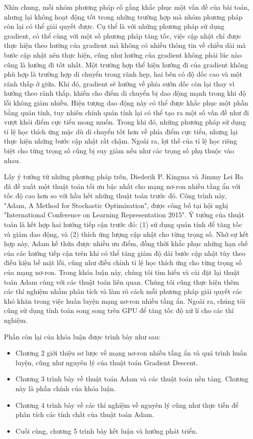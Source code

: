 Nhìn chung, mỗi nhóm phương pháp cố gắng khắc phục một vấn đề của bài toán, nhưng lại không hoạt động tốt trong những trường hợp mà nhóm phương pháp còn lại có thể giải quyết được. Cụ thể là với những phương pháp sử dụng gradient, có thể cùng với một số phương pháp tăng tốc, việc cập nhật chỉ được thực hiện theo hướng của gradient mà không có nhiều thông tin về chiều dài mà bước cập nhật nên thực hiện, cũng như hướng của gradient không phải lúc nào cũng là hướng đi tốt nhất. Một trường hợp thể hiện hướng đi của gradient không phù hợp là trường hợp di chuyển trong rãnh hẹp, hai bên có độ dốc cao và một rãnh thấp ở giữa. Khi đó, gradient sẽ hướng về phía sườn dốc còn lại thay vì hướng theo rãnh thấp, khiến cho điểm di chuyển bị dao động mạnh trong khi độ lỗi không giảm nhiều. Hiện tượng dao động này có thể được khắc phục một phần bằng quán tính, tuy nhiên chính quán tính lại có thể tạo ra một số vấn đề như đi vượt khỏi điểm cực tiểu mong muốn. Trong khi đó, những phương pháp sử dụng tỉ lệ học thích ứng mặc dù di chuyển tốt hơn về phía điểm cực tiểu, nhưng lại thực hiện những bước cập nhật rất chậm. Ngoài ra, lợi thế của tỉ lệ học riêng biệt cho từng trọng số cũng bị suy giảm nếu như các trọng số phụ thuộc vào nhau.

Lấy ý tưởng từ những phương pháp trên, Diederik P. Kingma và Jimmy Lei Ba đã đề xuất một thuật toán tối ưu bậc nhất cho mạng nơ-ron nhiều tầng ẩn với tốc độ cao hơn so với hầu hết những thuật toán trước đó. Công trình này, "Adam, A Method for Stochastic Optimization", được công bố tại hội nghị "International Conference on Learning Representation 2015". Ý tưởng của thuật toán là kết hợp hai hướng tiếp cận trước đó: (1) sử dụng quán tính để tăng tốc và giảm dao động, và (2) thích ứng lượng cập nhật cho từng trọng số. Nhờ sự kết hợp này, Adam kế thừa được nhiều ưu điểm, đồng thời khắc phục những hạn chế của các hướng tiếp cận trên khi có thể tăng giảm độ dài bước cập nhật tùy theo điều kiện bề mặt lỗi, cũng như điều chỉnh tỉ lệ học thích ứng cho từng trọng số của mạng nơ-ron. Trong khóa luận này, chúng tôi tìm hiểu và cài đặt lại thuật toán Adam cùng với các thuật toán liên quan. Chúng tôi cũng thực hiện thêm các thí nghiệm nhằm phân tích và làm rõ cách mỗi phương pháp giải quyết các khó khăn trong việc huấn luyện mạng nơ-ron nhiều tầng ẩn. Ngoài ra, chúng tôi cũng sử dụng tính toán song song trên GPU để tăng tốc độ xử lí cho các thí nghiệm.

Phần còn lại của khóa luận được trình bày như sau:

\begin{itemize}
	\item Chương 2 giới thiệu sơ lược về mạng nơ-ron nhiều tầng ẩn và quá trình huấn luyện, cũng như nguyên lý của thuật toán Gradient Descent.
	\item Chương 3 trình bày về thuật toán Adam và các thuật toán nền tảng. Chương này là phần chính của khóa luận.
	\item Chương 4 trình bày về các thí nghiệm về nguyên lý cũng như thực tiễn để phân tích các tính chất của thuật toán Adam.
	\item Cuối cùng, chương 5 trình bày kết luận và hướng phát triển.
\end{itemize}